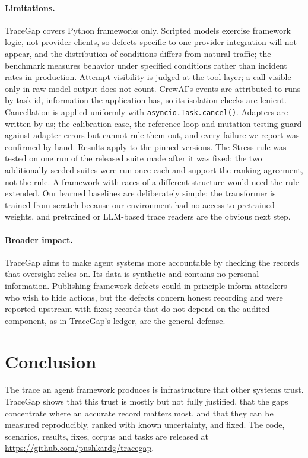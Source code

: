 \documentclass[10pt]{article}
\newcommand{\codeurl}{\url{https://github.com/pushkardg/tracegap}}
\begin{document}
\paragraph{Limitations.} TraceGap covers Python frameworks only. Scripted models exercise framework logic, not provider clients, so defects specific to one provider integration will not appear, and the distribution of conditions differs from natural traffic; the benchmark measures behavior under specified conditions rather than incident rates in production. Attempt visibility is judged at the tool layer; a call visible only in raw model output does not count. CrewAI's events are attributed to runs by task id, information the application has, so its isolation checks are lenient. Cancellation is applied uniformly with \texttt{asyncio.Task.cancel()}. Adapters are written by us; the calibration case, the reference loop and mutation testing guard against adapter errors but cannot rule them out, and every failure we report was confirmed by hand. Results apply to the pinned versions. The Stress rule was tested on one run of the released suite made after it was fixed; the two additionally seeded suites were run once each and support the ranking agreement, not the rule. A framework with races of a different structure would need the rule extended. Our learned baselines are deliberately simple; the transformer is trained from scratch because our environment had no access to pretrained weights, and pretrained or LLM-based trace readers are the obvious next step.

\paragraph{Broader impact.} TraceGap aims to make agent systems more accountable by checking the records that oversight relies on. Its data is synthetic and contains no personal information. Publishing framework defects could in principle inform attackers who wish to hide actions, but the defects concern honest recording and were reported upstream with fixes; records that do not depend on the audited component, as in TraceGap's ledger, are the general defense.

\section{Conclusion}
The trace an agent framework produces is infrastructure that other systems trust. TraceGap shows that this trust is mostly but not fully justified, that the gaps concentrate where an accurate record matters most, and that they can be measured reproducibly, ranked with known uncertainty, and fixed. The code, scenarios, results, fixes, corpus and tasks are released at \codeurl.
\end{document}
